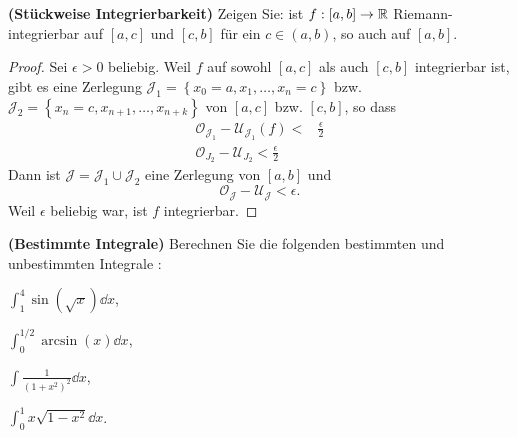 \begin{Problem}
	\textbf{(Stückweise Integrierbarkeit)} Zeigen Sie: ist $f:[a,b]\to \mathbb{R}$ Riemann-integrierbar auf $[a,c]$ und $[c,b]$ f\"{u}r ein $c\in (a,b)$, so auch auf $[a,b]$.	
\end{Problem}
\begin{proof}
	Sei $\epsilon>0$ beliebig. Weil $f$ auf sowohl $[a,c]$ als auch $[c,b]$ integrierbar ist, gibt es eine Zerlegung $\mathcal{J}_1=\left\{ x_0=a,x_1,\dots,x_n=c \right\} $ bzw. $\mathcal{J}_2=\left\{ x_n=c,x_{n+1},\dots, x_{n+k} \right\} $ von $[a,c]$ bzw. $[c,b]$, so dass
	\begin{align*}
		\mathcal{O}_{\mathcal{J}_1}-\mathcal{U}_{\mathcal{J}_1}(f)<& \frac{\epsilon}{2}\\
		\mathcal{O}_{J_2}-\mathcal{U}_{J_2}<\frac{\epsilon}{2}
	\end{align*}
	Dann ist $\mathcal{J}=\mathcal{J}_1\cup \mathcal{J}_2$ eine Zerlegung von $[a,b]$ und
	\[
		\mathcal{O}_{\mathcal{J}}-\mathcal{U}_{\mathcal{J}}<\epsilon
	.\] 
	Weil $\epsilon$ beliebig war, ist $f$ integrierbar.
\end{proof}
\begin{Problem}
	\textbf{(Bestimmte Integrale)} Berechnen Sie die folgenden bestimmten und unbestimmten Integrale
:
\begin{parts}
	\item $\int_1^4 \sin(\sqrt{x})\dd{x}$,
	\item $\int_0^{1 / 2}\arcsin(x)\dd{x}$,
	\item $\int \frac{1}{(1+x^2)^2}\dd{x}$,
	\item $\int_0^1 x\sqrt{1-x^2} \dd{x}$.
\end{parts}
\end{Problem}
